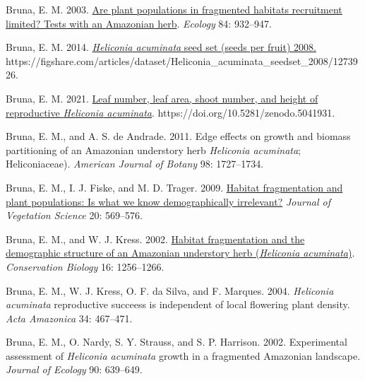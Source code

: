 \documentclass[
  12pt,
  man, donotrepeattitle,floatsintext]{apa6}
\newlength{\cslhangindent}
\newlength{\cslentryspacingunit} %
\newenvironment{CSLReferences}[2] %
 {%
  \setlength{\parindent}{0pt}
  \ifodd #1
  \let\oldpar\par
  \def\par{\hangindent=\cslhangindent\oldpar}
  \fi
  \setlength{\parskip}{#2\cslentryspacingunit}
 }%
 {}
\begin{document}
\begin{CSLReferences}{1}{0}
\leavevmode{}%
Bruna, E. M. 2003. \href{https://doi.org/10.1890/0012-9658(2003)084\%5B0932:APPIFH\%5D2.0.CO;2}{Are plant populations in fragmented habitats recruitment limited? {Tests} with an {Amazonian} herb}. \emph{Ecology} 84: 932--947.

\leavevmode{}%
Bruna, E. M. 2014. \href{https://doi.org/10.6084/m9.figshare.1273926.v2}{\emph{{Heliconia} acuminata} seed set (seeds per fruit) 2008.} https://figshare.com/articles/dataset/Heliconia\_acuminata\_seedset\_2008/1273926.

\leavevmode{}%
Bruna, E. M. 2021. \href{https://doi.org/10.5281/zenodo.5041931}{Leaf number, leaf area, shoot number, and height of reproductive \emph{{Heliconia} acuminata}}. https://doi.org/10.5281/zenodo.5041931.

\leavevmode{}%
Bruna, E. M., and A. S. de Andrade. 2011. Edge effects on growth and biomass partitioning of an {Amazonian} understory herb \emph{{Heliconia} acuminata}; {Heliconiaceae}). \emph{American Journal of Botany} 98: 1727--1734.

\leavevmode{}%
Bruna, E. M., I. J. Fiske, and M. D. Trager. 2009. \href{https://doi.org/10.1111/j.1654-1103.2009.01060.x}{Habitat fragmentation and plant populations: Is what we know demographically irrelevant?} \emph{Journal of Vegetation Science} 20: 569--576.

\leavevmode{}%
Bruna, E. M., and W. J. Kress. 2002. \href{https://doi.org/10.1046/j.1523-1739.2002.99494.x}{Habitat fragmentation and the demographic structure of an {Amazonian} understory herb (\emph{{Heliconia} acuminata})}. \emph{Conservation Biology} 16: 1256--1266.

\leavevmode{}%
Bruna, E. M., W. J. Kress, O. F. da Silva, and F. Marques. 2004. \emph{{Heliconia} acuminata} reproductive succeess is independent of local flowering plant density. \emph{Acta Amazonica} 34: 467--471.

\leavevmode{}%
Bruna, E. M., O. Nardy, S. Y. Strauss, and S. P. Harrison. 2002. Experimental assessment of \emph{{Heliconia} acuminata} growth in a fragmented {Amazonian} landscape. \emph{Journal of Ecology} 90: 639--649.


\end{CSLReferences}
\end{document}
